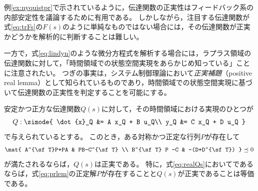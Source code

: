 \documentclass[tombow,dvipdfmx]{corona-a5}
\begin{document}
例\ref{ex:nyquistpr}で示されているように，伝達関数の正実性はフィードバック系の内部安定性を議論するために有用である。
しかしながら，注目する伝達関数が式\ref{eq:trFs}の$F(s)$のように単純なものではない場合には，その伝達関数が正実かどうかを解析的に判断することは難しい。

一方で，式\ref{eq:lindyn}のような微分方程式を解析する場合には，ラプラス領域の伝達関数に対して，「時間領域での状態空間実現をあらかじめ知っている」ことに注意されたい。
つぎの事実は，システム制御理論において\emph{正実補題}（positive real lemma）として知られているものであり\cite{rantzer1996kalman}，時間領域での状態空間実現に基づいて伝達関数の正実性を判定することを可能にする。

\begin{補題}[正実補題]\label{lem:prlem}
安定かつ正方な伝達関数$Q(s)$に対して，その時間領域における実現のひとつが
\begin{align}\label{eq:realQs}
Q: \simode{
\dot{x}_Q &= A x_Q + B u_Q\\
y_Q &= C x_Q + D u_Q
}
\end{align}
で与えられているとする。
このとき，ある対称かつ正定な行列$P$が存在して
\begin{align}\label{eq:prlem}
\mat{
A^{\sf T}P+PA & PB-C^{\sf T} \\
B^{\sf T} P -C & -(D+D^{\sf T})
}\preceq 0
\end{align}
が満たされるならば，$Q(s)$は正実である。
特に，式\ref{eq:realQs}においてであるならば，式\ref{eq:prlem}の正定解$P$が存在することと$Q(s)$が正実であることは等価である。
\end{補題}
\end{document}
